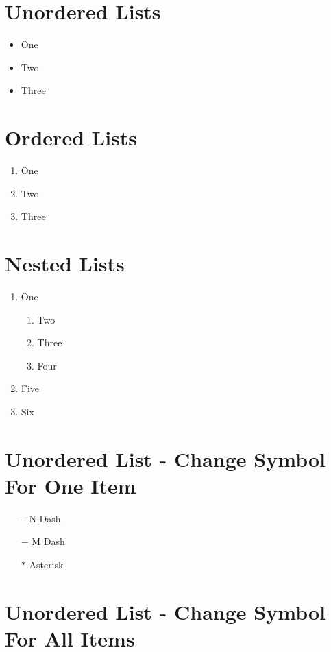 \documentclass[]{article}
\begin{document}
\section{Unordered Lists}

\begin{itemize}
	\item One
	\item Two
	\item Three
\end{itemize}

\section{Ordered Lists}

\begin{enumerate}
	\item One
	\item Two
	\item Three
\end{enumerate}

\section{Nested Lists}

\begin{enumerate}
	\item One
    \begin{enumerate}
    	\item Two
        \item Three
        \item Four
    \end{enumerate}
    \item Five
    \item Six
\end{enumerate}

\section{Unordered List - Change Symbol For One Item}

\begin{itemize}
	\item[--] N Dash
    \item[$-$] M Dash
    \item[$\ast$] Asterisk
\end{itemize}

\section{Unordered List - Change Symbol For All Items}
\end{document}
